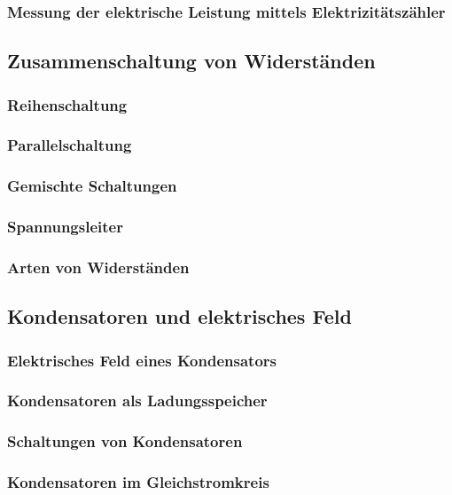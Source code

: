 \subsubsection{Messung der elektrische Leistung mittels Elektrizitätszähler}
	

\subsection{Zusammenschaltung von Widerständen}
\subsubsection{Reihenschaltung}
\subsubsection{Parallelschaltung}
\subsubsection{Gemischte Schaltungen}
\subsubsection{Spannungsleiter}
\subsubsection{Arten von Widerständen}

\subsection{Kondensatoren und elektrisches Feld}
\subsubsection{Elektrisches Feld eines Kondensators}
\subsubsection{Kondensatoren als Ladungsspeicher}
\subsubsection{Schaltungen von Kondensatoren}
\subsubsection{Kondensatoren im Gleichstromkreis}

